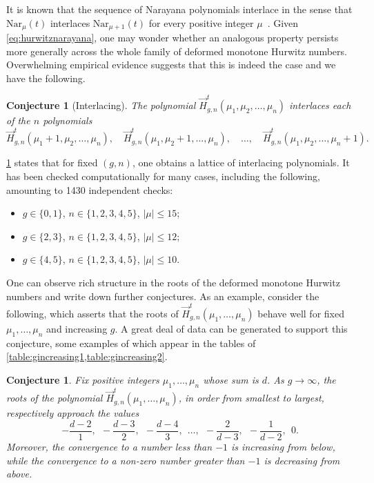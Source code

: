 \documentclass[a4paper]{article}
\theoremstyle{plain}
\newtheorem{conjecture}[theorem]{Conjecture}
\numberwithin{theorem}{section}
\theoremstyle{definition}
\theoremstyle{remark}
\renewcommand{\leq}{\leqslant}
\newcommand{\HN}[3]{\vec{H}^t_{#1,#2}(#3)}
\begin{document}
It is known that the sequence of Narayana polynomials interlace in the sense that $\mathrm{Nar}_\mu(t)$ interlaces $\mathrm{Nar}_{\mu+1}(t)$ for every positive integer $\mu$~\cite{fis06}. Given \cref{eq:hurwitznarayana}, one may wonder whether an analogous property persists more generally across the whole family of deformed monotone Hurwitz numbers. Overwhelming empirical evidence suggests that this is indeed the case and we have the following.


\begin{conjecture}[Interlacing] \label{con:interlacing}
The polynomial $\HN{g}{n}{\mu_1, \mu_2, \ldots, \mu_n}$ interlaces each of the $n$ polynomials
\[
\HN{g}{n}{\mu_1+1, \mu_2, \ldots, \mu_n}, \quad \HN{g}{n}{\mu_1, \mu_2+1, \ldots, \mu_n}, \quad \ldots, \quad \HN{g}{n}{\mu_1, \mu_2, \ldots, \mu_n+1}.
\]
\end{conjecture}


\cref{con:interlacing} states that for fixed $(g,n)$, one obtains a lattice of interlacing polynomials. It has been checked computationally for many cases, including the following, amounting to 1430 independent checks:
\begin{itemize}
\item $g \in \{0, 1\}$, $n \in \{1, 2, 3, 4, 5\}$, $|\mu| \leq 15$;
\item $g \in \{2, 3\}$, $n \in \{1, 2, 3, 4, 5\}$, $|\mu| \leq 12$;
\item $g \in \{4, 5\}$, $n \in \{1, 2, 3, 4, 5\}$, $|\mu| \leq 10$.
\end{itemize}


One can observe rich structure in the roots of the deformed monotone Hurwitz numbers and write down further conjectures. As an example, consider the following, which asserts that the roots of $\HN{g}{n}{\mu_1, \ldots, \mu_n}$ behave well for fixed $\mu_1, \ldots, \mu_n$ and increasing $g$. A great deal of data can be generated to support this conjecture, some examples of which appear in the tables of \cref{table:gincreasing1,table:gincreasing2}.


\begin{conjecture} \label{con:largeg}
Fix positive integers $\mu_1, \ldots, \mu_n$ whose sum is $d$. As $g \to \infty$, the roots of the polynomial $\HN{g}{n}{\mu_1, \ldots, \mu_n}$, in order from smallest to largest, respectively approach the values
\[
- \frac{d-2}{1}, ~~ - \frac{d-3}{2}, ~~ - \frac{d-4}{3}, ~~ \ldots, ~~ - \frac{2}{d-3}, ~~ - \frac{1}{d-2}, ~~ 0.
\]
Moreover, the convergence to a number less than $-1$ is increasing from below, while the convergence to a non-zero number greater than $-1$ is decreasing from above.
\end{conjecture}
\end{document}
